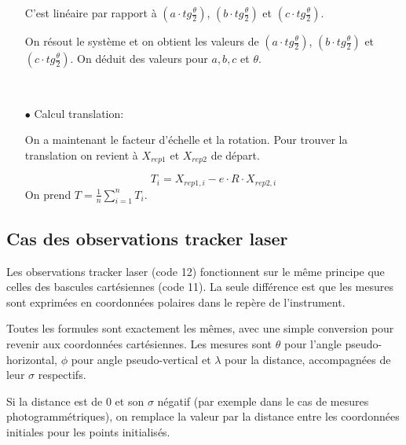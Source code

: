 \documentclass[french]{report}
\begin{document}
\begin{itemize}
C'est linéaire par rapport à $(a\cdot tg \frac{\theta}{2})$, $(b\cdot tg \frac{\theta}{2})$ et $(c\cdot tg \frac{\theta}{2})$.

On résout le système et on obtient les valeurs de $(a\cdot tg \frac{\theta}{2})$, $(b\cdot tg \frac{\theta}{2})$ et $(c\cdot tg \frac{\theta}{2})$. On déduit des valeurs pour $a,b,c$ et $\theta$.

\
\item[$\bullet$]Calcul translation:

On a maintenant le facteur d'échelle et la rotation. Pour trouver la translation on revient à $X_{rep1}$ et $X_{rep2}$ de départ.

$$T_i=X_{rep1,i}-e\cdot R \cdot X_{rep2,i}$$
On prend $T=\frac{1}{n} \sum_{i=1}^{n} T_i$.

\end{itemize}


\subsection{Cas des observations tracker laser}

Les observations tracker laser (code 12) fonctionnent sur le même principe que celles des bascules cartésiennes (code 11). La seule différence est que les mesures sont exprimées en coordonnées polaires dans le repère de l'instrument.

Toutes les formules sont exactement les mêmes, avec une simple conversion pour revenir aux coordonnées cartésiennes.
Les mesures sont $\theta$ pour l'angle pseudo-horizontal, $\phi$ pour angle pseudo-vertical et $\lambda$ pour la distance, accompagnées de leur $\sigma$ respectifs.

Si la distance est de $0$ et son $\sigma$ négatif (par exemple dans le cas de mesures photogrammétriques),
on remplace la valeur par la distance entre les coordonnées initiales pour les points initialisés.
\end{document}
